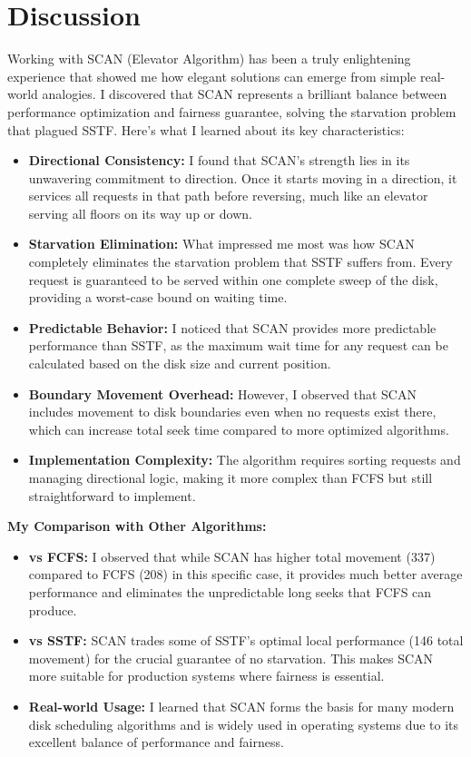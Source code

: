 \documentclass[12pt,a4paper]{article}
\begin{document}
\section{Discussion}
Working with SCAN (Elevator Algorithm) has been a truly enlightening experience that showed me how elegant solutions can emerge from simple real-world analogies. I discovered that SCAN represents a brilliant balance between performance optimization and fairness guarantee, solving the starvation problem that plagued SSTF. Here's what I learned about its key characteristics:

\begin{itemize}
    \item \textbf{Directional Consistency:} I found that SCAN's strength lies in its unwavering commitment to direction. Once it starts moving in a direction, it services all requests in that path before reversing, much like an elevator serving all floors on its way up or down.
    \item \textbf{Starvation Elimination:} What impressed me most was how SCAN completely eliminates the starvation problem that SSTF suffers from. Every request is guaranteed to be served within one complete sweep of the disk, providing a worst-case bound on waiting time.
    \item \textbf{Predictable Behavior:} I noticed that SCAN provides more predictable performance than SSTF, as the maximum wait time for any request can be calculated based on the disk size and current position.
    \item \textbf{Boundary Movement Overhead:} However, I observed that SCAN includes movement to disk boundaries even when no requests exist there, which can increase total seek time compared to more optimized algorithms.
    \item \textbf{Implementation Complexity:} The algorithm requires sorting requests and managing directional logic, making it more complex than FCFS but still straightforward to implement.
\end{itemize}

\textbf{My Comparison with Other Algorithms:}
\begin{itemize}
    \item \textbf{vs FCFS:} I observed that while SCAN has higher total movement (337) compared to FCFS (208) in this specific case, it provides much better average performance and eliminates the unpredictable long seeks that FCFS can produce.
    \item \textbf{vs SSTF:} SCAN trades some of SSTF's optimal local performance (146 total movement) for the crucial guarantee of no starvation. This makes SCAN more suitable for production systems where fairness is essential.
    \item \textbf{Real-world Usage:} I learned that SCAN forms the basis for many modern disk scheduling algorithms and is widely used in operating systems due to its excellent balance of performance and fairness.
\end{itemize}
\end{document}

